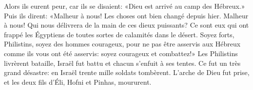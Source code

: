 Alors ils eurent peur, car ils se disaient:
	«Dieu est arrivé au camp des Hébreux.»
Puis ils dirent: «Malheur à nous! Les choses ont bien changé depuis hier.
	Malheur à nous!
		Qui nous délivrera de la main de ces dieux puissants?
Ce sont eux qui ont frappé les Égyptiens de toutes sortes de calamités dans le désert.
Soyez forts, Philistins, soyez des hommes courageux,
	pour ne pas être asservis aux Hébreux comme ils vous ont été asservis:
	soyez courageux et combattez!»
Les Philistins livrèrent bataille, Israël fut battu et chacun s’enfuit à ses tentes.
	Ce fut un très grand désastre: en Israël trente mille soldats tombèrent.
L’arche de Dieu fut prise, et les deux fils d’Éli, Hofni et Pinhas, moururent.
